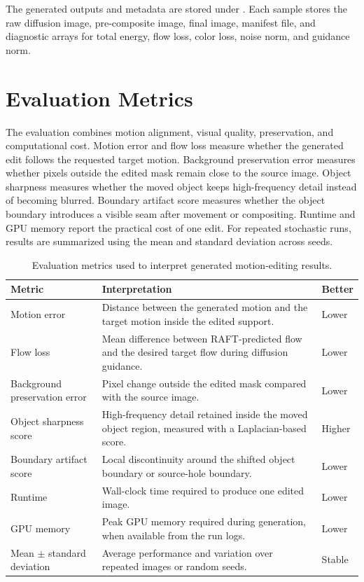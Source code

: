The generated outputs and metadata are stored under . Each sample stores the raw diffusion image, pre-composite image, final image, manifest file, and diagnostic arrays for total energy, flow loss, color loss, noise norm, and guidance norm.

\section{Evaluation Metrics}

The evaluation combines motion alignment, visual quality, preservation, and computational cost. Motion error and flow loss measure whether the generated edit follows the requested target motion. Background preservation error measures whether pixels outside the edited mask remain close to the source image. Object sharpness measures whether the moved object keeps high-frequency detail instead of becoming blurred. Boundary artifact score measures whether the object boundary introduces a visible seam after movement or compositing. Runtime and GPU memory report the practical cost of one edit. For repeated stochastic runs, results are summarized using the mean and standard deviation across seeds.

\begin{table}[p]
  \centering
  \scriptsize
  \caption{Evaluation metrics used to interpret generated motion-editing results.}
  \label{tab:evaluation-metrics}
  \renewcommand{\arraystretch}{1.12}
  \begin{tabular}{p{1.25in}|p{3.05in}|p{0.75in}}
    \hline
    \textbf{Metric} & \textbf{Interpretation} & \textbf{Better} \\ \hline \hline
    Motion error & Distance between the generated motion and the target motion inside the edited support. & Lower \\ \hline
    Flow loss & Mean difference between RAFT-predicted flow and the desired target flow during diffusion guidance. & Lower \\ \hline
    Background preservation error & Pixel change outside the edited mask compared with the source image. & Lower \\ \hline
    Object sharpness score & High-frequency detail retained inside the moved object region, measured with a Laplacian-based score. & Higher \\ \hline
    Boundary artifact score & Local discontinuity around the shifted object boundary or source-hole boundary. & Lower \\ \hline
    Runtime & Wall-clock time required to produce one edited image. & Lower \\ \hline
    GPU memory & Peak GPU memory required during generation, when available from the run logs. & Lower \\ \hline
    Mean $\pm$ standard deviation & Average performance and variation over repeated images or random seeds. & Stable \\ \hline
  \end{tabular}
\end{table}


